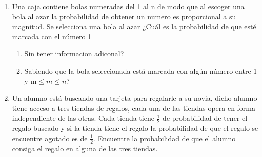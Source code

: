 \documentclass[12pt,a4paper]{report}
\begin{document}
\begin{enumerate}
  \item{
 Una caja contiene bolas numeradas del 1 al n de modo que al escoger una bola al azar la probabilidad de obtener un numero es proporcional a su magnitud. Se selecciona una bola al azar ¿Cuál es la probabilidad de que esté marcada con el número 1\\
 \begin{enumerate}[label= \alph*) ]
 \item{Sin tener informacion adiconal?}\\
 \item{Sabiendo que la bola seleccionada está marcada con algún número entre 1 y m$\leq m \leq n$?}
 \end{enumerate}
  }

  \item{
Un alumno está buscando una tarjeta para regalarle a su novia, dicho alumno tiene acceso a tres tiendas de regalos, cada una de las tiendas opera en forma independiente de las otras. Cada tienda tiene $\frac{1}{2}$ de probabilidad de tener el regalo buscado y si la tienda tiene el regalo la probabilidad de que el regalo se encuentre agotado es de $\frac{1}{2}$. Encuentre la probabilidad de que el alumno consiga el regalo en alguna de las tres tiendas.
  }






\end{enumerate}
\end{document}
